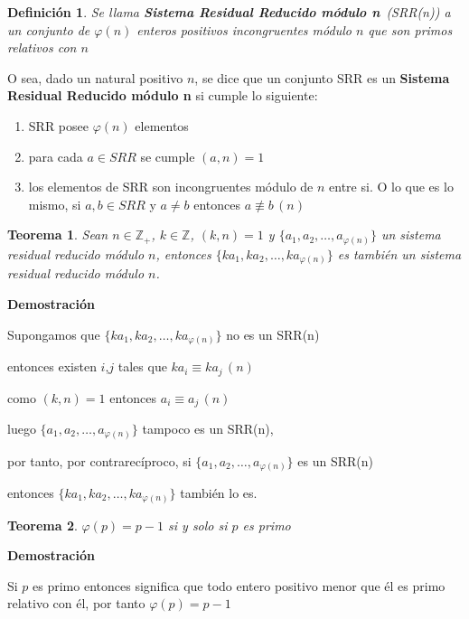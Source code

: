\documentclass[a4paper,12pt]{report}
\newtheorem*{teo}{Teorema}
\newtheorem*{dfn}{Definición}
\begin{document}
 \begin{dfn}
  Se llama \textbf{Sistema Residual Reducido módulo n}~(SRR(n)) a un conjunto de $\varphi(n)$ enteros positivos incongruentes módulo $n$ que son primos relativos con $n$
 \end{dfn}

 O sea, dado un natural positivo $n$, se dice que un conjunto SRR es un \textbf{Sistema Residual Reducido módulo n} si cumple lo siguiente:

 \begin{enumerate}
  \item SRR posee $\varphi(n)$ elementos
  \item para cada $a\in SRR$ se cumple $(a,n)=1$
  \item los elementos de SRR son incongruentes módulo de $n$ entre si. O lo que es lo mismo,  si $a,b\in SRR$ y $a\neq b$ entonces $a\not\equiv b \, (n)$
 \end{enumerate}

 \begin{teo}
 Sean $n\in\mathbb{Z}_+$, $k\in\mathbb{Z}$, $(k,n)=1$ y $\{a_1,a_2,\dots,a_{\varphi(n)}\}$ un sistema residual reducido módulo $n$, entonces $\{ka_1,ka_2,\dots,ka_{\varphi(n)}\}$ es también un sistema residual reducido módulo $n$.
\end{teo}

\textbf{Demostración}


Supongamos que $\{ka_1,ka_2,\dots,ka_{\varphi(n)}\}$ no es un SRR(n)

entonces existen $i$,$j$ tales que $ka_i\equiv ka_j \, (n)$

como $(k,n)=1$ entonces $a_i\equiv a_j \, (n)$

luego $\{a_1,a_2,\dots,a_{\varphi(n)}\}$ tampoco es un SRR(n),

por tanto, por contrarecíproco, si $\{a_1,a_2,\dots,a_{\varphi(n)}\}$ es un SRR(n)

entonces $\{ka_1,ka_2,\dots,ka_{\varphi(n)}\}$ también lo es.

\begin{teo}
 $\varphi(p)=p-1$ si y solo si $p$ es primo
\end{teo}

\textbf{Demostración}

Si $p$ es primo entonces significa que todo entero positivo menor que él es primo relativo con él, por tanto $\varphi(p)=p-1$
\end{document}

